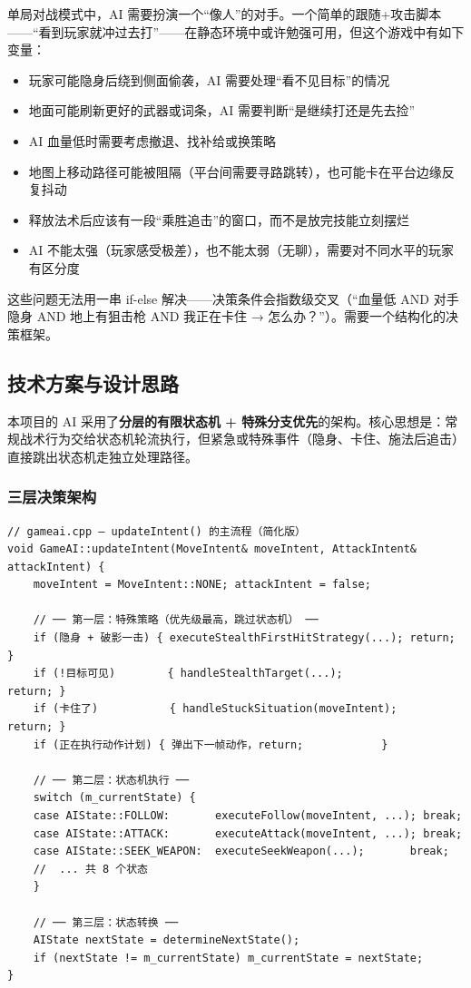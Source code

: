 \documentclass[utf8]{ctexart}
\begin{document}
单局对战模式中，AI 需要扮演一个“像人”的对手。一个简单的跟随+攻击脚本——“看到玩家就冲过去打”——在静态环境中或许勉强可用，但这个游戏中有如下变量：

\begin{itemize}
  \item 玩家可能隐身后绕到侧面偷袭，AI 需要处理“看不见目标”的情况
  \item 地面可能刷新更好的武器或词条，AI 需要判断“是继续打还是先去捡”
  \item AI 血量低时需要考虑撤退、找补给或换策略
  \item 地图上移动路径可能被阻隔（平台间需要寻路跳转），也可能卡在平台边缘反复抖动
  \item 释放法术后应该有一段“乘胜追击”的窗口，而不是放完技能立刻摆烂
  \item AI 不能太强（玩家感受极差），也不能太弱（无聊），需要对不同水平的玩家有区分度
\end{itemize}

这些问题无法用一串 if-else 解决——决策条件会指数级交叉（“血量低 AND 对手隐身 AND 地上有狙击枪 AND 我正在卡住 → 怎么办？”）。需要一个结构化的决策框架。

\subsection{技术方案与设计思路}

本项目的 AI 采用了\textbf{分层的有限状态机 + 特殊分支优先}的架构。核心思想是：常规战术行为交给状态机轮流执行，但紧急或特殊事件（隐身、卡住、施法后追击）直接跳出状态机走独立处理路径。

\subsubsection{三层决策架构}

\begin{verbatim}
// gameai.cpp — updateIntent() 的主流程（简化版）
void GameAI::updateIntent(MoveIntent& moveIntent, AttackIntent& attackIntent) {
    moveIntent = MoveIntent::NONE; attackIntent = false;

    // ── 第一层：特殊策略（优先级最高，跳过状态机） ──
    if (隐身 + 破影一击) { executeStealthFirstHitStrategy(...); return; }
    if (!目标可见)        { handleStealthTarget(...);            return; }
    if (卡住了)           { handleStuckSituation(moveIntent);    return; }
    if (正在执行动作计划) { 弹出下一帧动作，return;            }

    // ── 第二层：状态机执行 ──
    switch (m_currentState) {
    case AIState::FOLLOW:       executeFollow(moveIntent, ...); break;
    case AIState::ATTACK:       executeAttack(moveIntent, ...); break;
    case AIState::SEEK_WEAPON:  executeSeekWeapon(...);       break;
    //  ... 共 8 个状态
    }

    // ── 第三层：状态转换 ──
    AIState nextState = determineNextState();
    if (nextState != m_currentState) m_currentState = nextState;
}
\end{verbatim}
\end{document}
